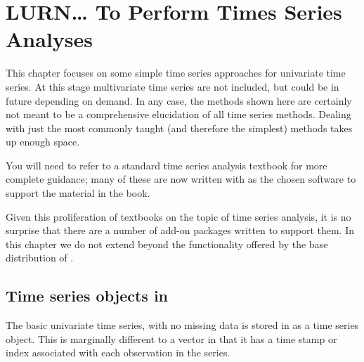 

\chapter{LURN\ldots{} To Perform Times Series Analyses} 
\label{TimeSeries} 
 

 
This chapter focuses on some simple time series approaches for univariate time series. At this stage multivariate time series are not included, but could be in future depending on demand. In any case, the methods shown here are certainly not meant to be a comprehensive elucidation of all time series methods. Dealing with just the most commonly taught (and therefore the simplest) methods takes up enough space.  
 
You will need to refer to a standard time series analysis textbook for more complete guidance; many of these are now written with \R{} as the chosen software to support the material in the book. 
 
Given this proliferation of textbooks on the topic of time series analysis, it is no surprise that there are a number of add-on packages written to support them. In this chapter we do not extend beyond the functionality offered by the base distribution of \R{}. 
 
\section{Time series objects in \R{}} 
 
The basic univariate time series, with no missing data is stored in \R{} as a time series object. This is marginally different to a vector in that it has a time stamp or index associated with each observation in the series. 
 
